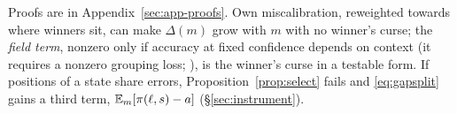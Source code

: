 Proofs are in Appendix~\ref{sec:app-proofs}. Own miscalibration, reweighted towards where
winners sit, can make $\Delta(m)$ grow with $m$ with no winner's curse; the \emph{field term},
nonzero only if accuracy at fixed confidence depends on context (it requires a nonzero
grouping loss; \citealp{kull2015decomp,perezlebel2023grouping}), is the winner's curse in a
testable form. If positions of a state share errors, Proposition~\ref{prop:select} fails and
\eqref{eq:gapsplit} gains a third term, $\mathbb{E}_m[\pi(\ell,s)-a]$ (\S\ref{sec:instrument}).
